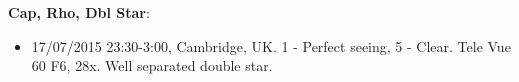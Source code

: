 {\bf Cap, Rho, Dbl Star}:
\begin{itemize}
\item 17/07/2015 23:30-3:00, Cambridge, UK. 1 - Perfect seeing, 5 - Clear. Tele Vue 60 F6, 28x. Well separated double star.
\end{itemize}
